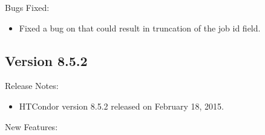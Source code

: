 \noindent Bugs Fixed:

\begin{itemize}

\item Fixed a bug on  that could result in truncation of
the job id field.

\end{itemize}

\subsection*{\label{sec:New-8-5-2}Version 8.5.2}

\noindent Release Notes:

\begin{itemize}

\item HTCondor version 8.5.2 released on February 18, 2015.

\end{itemize}


\noindent New Features:

